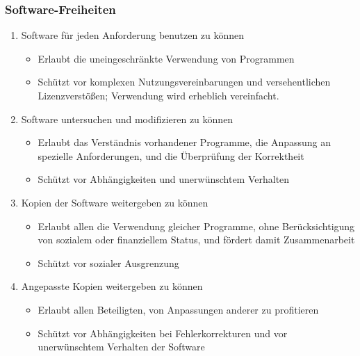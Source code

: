 \documentclass{beamer}
\begin{document}
\begin{frame}
  \frametitle{Software-Freiheiten}


  \onslide<+->

  \begin{enumerate}

  \item<+-> Software für jeden Anforderung benutzen zu können
    \begin{itemize}
    \item Erlaubt die uneingeschränkte Verwendung von Programmen
    \item Schützt vor komplexen Nutzungsvereinbarungen und versehentlichen
      Lizenzverstößen; Verwendung wird erheblich vereinfacht.
    \end{itemize}

  \item<+-> Software untersuchen und modifizieren zu können
    \begin{itemize}
    \item Erlaubt das Verständnis vorhandener Programme, die Anpassung an
      spezielle Anforderungen, und die Überprüfung der Korrektheit
    \item Schützt vor Abhängigkeiten und unerwünschtem Verhalten
    \end{itemize}

  \item<+-> Kopien der Software weitergeben zu können
    \begin{itemize}
    \item Erlaubt allen die Verwendung gleicher Programme, ohne Berücksichtigung
      von sozialem oder finanziellem Status, und fördert damit Zusammenarbeit
    \item Schützt vor sozialer Ausgrenzung
    \end{itemize}

  \item<+-> Angepasste Kopien weitergeben zu können
    \begin{itemize}
    \item Erlaubt allen Beteiligten, von Anpassungen anderer zu profitieren
    \item Schützt vor Abhängigkeiten bei Fehlerkorrekturen und vor unerwünschtem
      Verhalten der Software
    \end{itemize}
  \end{enumerate}

\end{frame}
\end{document}
